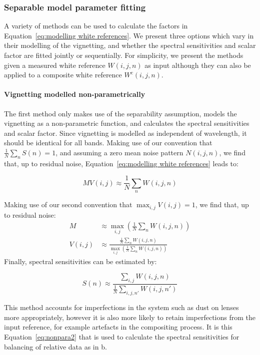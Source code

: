  

\subsubsection{Separable model parameter fitting}
\label{algorithmparameters}
A variety of methods can be used to calculate the factors in Equation~\eqref{eq:modelling white references}. We present three options which vary in their modelling of the vignetting, and whether the spectral sensitivities and scalar factor are fitted jointly or sequentially. For simplicity, we present the methods given a measured white reference $W(i,j,n)$ as input although they can also be applied to a composite white reference $W^{\textrm{c}}(i,j,n)$.

\paragraph{Vignetting modelled non-parametrically}
The first method only makes use of the separability assumption, models the vignetting as a non-parametric function, and calculates the spectral sensitivities and scalar factor. Since vignetting is modelled as independent of wavelength, it should be identical for all bands.
Making use of our convention that $\frac{1}{N} \sum_{n}S(n) = 1$, and assuming a zero mean noise pattern $N(i,j,n)$, we find that, up to residual noise, Equation~\eqref{eq:modelling white references} leads to:
%
%
\begin{linenomath*}
\begin{equation}
	M V(i,j) \approx \frac{1}{N}\sum_{n} W(i,j,n)
\label{eq:nonpara1}
\end{equation} 
\end{linenomath*}
%
Making use of our second convention that $\max_{i,j}V(i,j) = 1$, we find that, up to residual noise:
\begin{align}
	M &\approx \max_{i,j}\left( \frac{1}{N}\sum_{n} W(i,j,n) \right) \\
	V(i,j) &\approx \frac{ \frac{1}{N}\sum_{n} W(i,j,n) }{ \max_{i,j}\left( \frac{1}{N}\sum_{n} W(i,j,n) \right) }
\end{align} 
%
Finally, spectral sensitivities can be estimated by:
%
%
%	
%
%
\begin{linenomath*}
\begin{equation}
	S(n) \approx \frac{\sum_{i,j}W(i,j,n)}{\frac{1}{N}\sum_{i,j,n'}W(i,j,n')}
\label{eq:nonpara2}
\end{equation}
\end{linenomath*}
%
This method accounts for imperfections in the system such as dust on lenses more appropriately, however it is also more likely to retain imperfections from the input reference, for example artefacts in the compositing process. It is this Equation~\eqref{eq:nonpara2} that is used to calculate the spectral sensitivities for balancing of relative data as in b.

